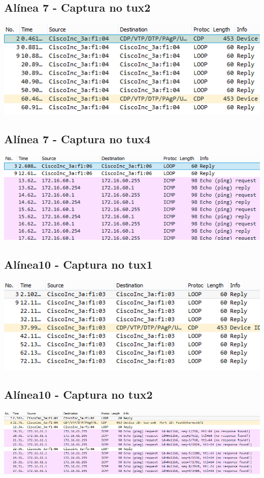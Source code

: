 \documentclass[11pt,a4paper,reqno]{report}
\numberwithin{equation}{section}
\begin{document}
\begin{appendices}
\subsection{Alínea 7 - Captura no tux2}
\label{ex2_tux1ping_tux2}
\includegraphics[width=18cm]{ex2_a7_tux2.png}
\subsection{Alínea 7 - Captura no tux4}
\label{ex2_tux1ping_tux4}
\includegraphics[width=18cm]{ex2_a7_tux4.png}

\subsection{Alínea10 - Captura no tux1}
\includegraphics[width=18cm]{ex2_a10_tux1.png}
\subsection{Alínea10 - Captura no tux2}
\includegraphics[width=18cm]{ex2_a10_tux2.png}

\end{appendices}
\end{document}
